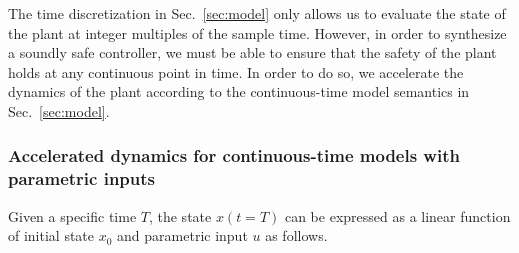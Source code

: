 \documentclass[twocolumn]{autart}    %
\newcommand{\mat}[1]{{#1}}
\renewcommand{\vec}[1]{{#1}}
\renewcommand{\note}[1]{\textcolor{red}{[#1]}}
\begin{document}

The time discretization in Sec.~\ref{sec:model} only allows us to evaluate
the state of the plant at integer multiples of the sample time.  
However, in order to synthesize a soundly safe controller, 
we must be able to ensure that the safety of the plant holds at any continuous point in time.  
In order to do so, we accelerate the dynamics of the plant according to the continuous-time model
semantics in Sec.~\ref{sec:model}. 


\subsubsection{Accelerated\! dynamics\! for\! continuous-time\! models\! with\! parametric\! inputs}\label{sec:real_discrete_param_inputs}
% 
Given a specific time $T$, the state $\vec{x}(t=T)$ can be expressed as a
linear function of initial state $\vec{x}_0$ and parametric input $\vec{u}$ as follows.   
 
\end{document}
